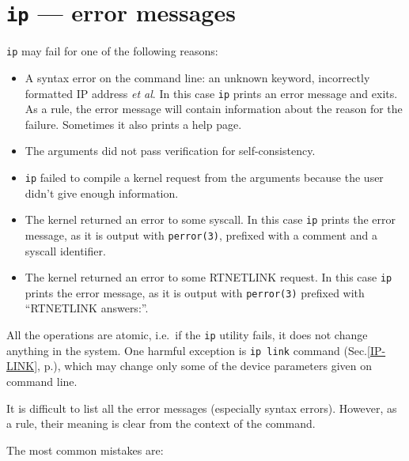 \section{{\tt ip} --- error messages}

\verb|ip| may fail for one of the following reasons:

\begin{itemize}
\item
A syntax error on the command line: an unknown keyword, incorrectly formatted
IP address {\em et al\/}. In this case \verb|ip| prints an error message
and exits. As a rule, the error message will contain information
about the reason for the failure. Sometimes it also prints a help page.

\item
The arguments did not pass verification for self-consistency.

\item
\verb|ip| failed to compile a kernel request from the arguments
because the user didn't give enough information.

\item
The kernel returned an error to some syscall. In this case \verb|ip|
prints the error message, as it is output with \verb|perror(3)|,
prefixed with a comment and a syscall identifier.

\item
The kernel returned an error to some RTNETLINK request.
In this case \verb|ip| prints the error message, as it is output
with \verb|perror(3)| prefixed with ``RTNETLINK answers:''.

\end{itemize}

All the operations are atomic, i.e.\ 
if the \verb|ip| utility fails, it does not change anything
in the system. One harmful exception is \verb|ip link| command
(Sec.\ref{IP-LINK}, p.\pageref{IP-LINK}),
which may change only some of the device parameters given
on command line.

It is difficult to list all the error messages (especially
syntax errors). However, as a rule, their meaning is clear
from the context of the command.

The most common mistakes are:


